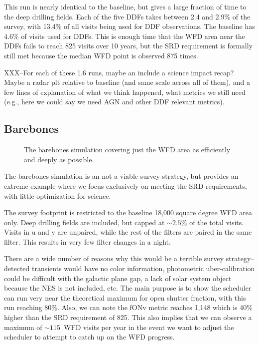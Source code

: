 This run is nearly identical to the baseline, but gives a large fraction of time to the deep drilling fields. Each of the five DDFs takes between 2.4 and 2.9\% of the survey, with 13.4\% of all visits being used for DDF observations. The baseline has 4.6\% of visits used for DDFs.  This is enough time that the WFD area near the DDFs fails to reach 825 visits over 10 years, but the SRD requirement is formally still met because the median WFD point is observed 875 times.

XXX--For each of these 1.6 runs, maybe an include a science impact recap? Maybe a radar plt relative to baseline (and same scale across all of them), and a few lines of explanation of what we think happened, what metrics we still need (e.g., here we could say we need AGN and other DDF relevant metrics).

\subsection{Barebones}

\begin{figure}
\caption{The barebones simulation covering just the WFD area as efficiently and deeply as possible.}\label{fig:barebones}
\end{figure}


The barebones simulation is an not a viable survey strategy, but provides an extreme example where we focus exclusively on meeting the SRD requirements, with little optimization for science.

The survey footprint is restricted to the baseline 18,000 square degree WFD area only. Deep drilling fields are included, but capped at $\sim2.5$\% of the total visits. Visits in u and y are unpaired, while the rest of the filters are paired in the same filter. This results in very few filter changes in a night. 

There are a wide number of reasons why this would be a terrible survey strategy--detected transients would have no color information, photometric uber-calibration could be difficult with the galactic plane gap, a lack of solar system object because the NES is not included, etc.  The main purpose is to show the scheduler can run very near the theoretical maximum for open shutter fraction, with this run reaching 80\%. Also, we can note the fONv metric reaches 1,148 which is 40\% higher than the SRD requirement of 825. This also implies that we can observe a maximum of $\sim115$\ WFD visits per year in the event we want to adjust the scheduler to attempt to catch up on the WFD progress. 


